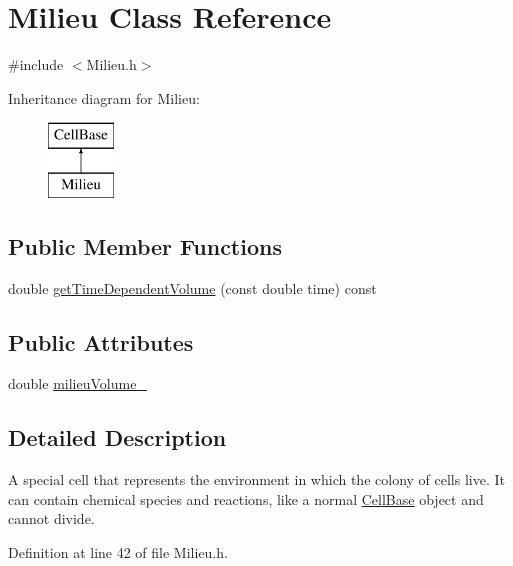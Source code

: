 \hypertarget{class_milieu}{\section{\-Milieu \-Class \-Reference}
\label{class_milieu}
}


{\ttfamily \#include $<$\-Milieu.\-h$>$}

\-Inheritance diagram for \-Milieu\-:\begin{figure}[H]
\begin{center}
\leavevmode
\includegraphics[height=2.000000cm]{class_milieu}
\end{center}
\end{figure}
\subsection*{\-Public \-Member \-Functions}
\begin{DoxyCompactItemize}
\item 
double \hyperlink{class_milieu_ad48c676f6943018da4d7dcab5c04a450}{get\-Time\-Dependent\-Volume} (const double time) const 
\end{DoxyCompactItemize}
\subsection*{\-Public \-Attributes}
\begin{DoxyCompactItemize}
\item 
double \hyperlink{class_milieu_add3fc66df8f106caf4eab9804b7e1210}{milieu\-Volume\-\_\-}
\end{DoxyCompactItemize}


\subsection{\-Detailed \-Description}
\-A special cell that represents the environment in which the colony of cells live. \-It can contain chemical species and reactions, like a normal \hyperlink{class_cell_base}{\-Cell\-Base} object and cannot divide. 

\-Definition at line 42 of file \-Milieu.\-h.



